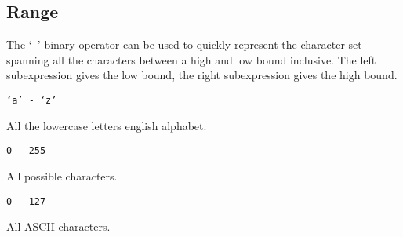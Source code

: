 
\subsection{Range}
{
	The `\texttt{-}' binary operator can be used to quickly represent the
	character set
	spanning all the characters between a high and low bound inclusive.
	The left subexpression gives the low bound, the right subexpression gives
	the high bound.
	
	\begin{itemize}
	{
		\item[] \texttt{`a' - `z'}
		
			All the lowercase letters english alphabet.
		
		\item[] \texttt{0 - 255}
		
			All possible characters.
		
		\item[] \texttt{0 - 127}
		
			All ASCII characters.
	}
	\end{itemize}
}
